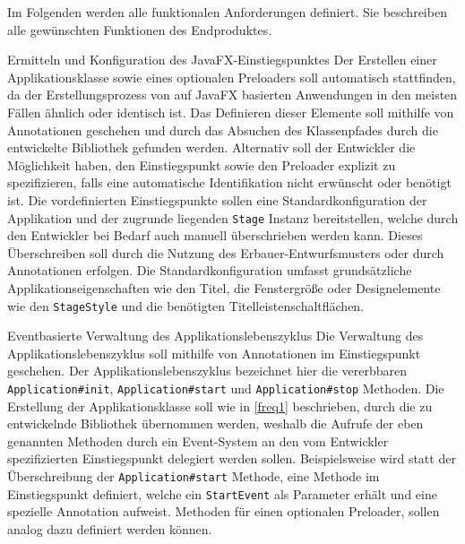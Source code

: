 Im Folgenden werden alle funktionalen Anforderungen definiert. Sie beschreiben alle gewünschten Funktionen des Endproduktes.
\begin{freq}{Ermitteln und Konfiguration des JavaFX-Einstiegspunktes}
	Der Erstellen einer Applikationsklasse sowie eines optionalen Preloaders soll automatisch stattfinden, da der Erstellungsprozess von auf JavaFX basierten Anwendungen in den meisten Fällen ähnlich oder identisch ist. Das Definieren dieser Elemente soll mithilfe von Annotationen geschehen und durch das Absuchen des Klassenpfades durch die entwickelte Bibliothek gefunden werden. Alternativ soll der Entwickler die Möglichkeit haben, den Einstiegspunkt sowie den Preloader explizit zu spezifizieren, falls eine automatische Identifikation nicht erwünscht oder benötigt ist. Die vordefinierten Einstiegspunkte sollen eine Standardkonfiguration der Applikation und der zugrunde liegenden \texttt{Stage} Instanz bereitstellen, welche durch den Entwickler bei Bedarf auch manuell überschrieben werden kann. Dieses Überschreiben soll durch die Nutzung des Erbauer-Entwurfsmusters oder durch Annotationen erfolgen. Die Standardkonfiguration umfasst grundsätzliche Applikationseigenschaften wie den Titel, die Fenstergröße oder Designelemente wie den \texttt{StageStyle} und die benötigten Titelleistenschaltflächen.
\end{freq}
\begin{freq}{Eventbasierte Verwaltung des Applikationslebenszyklus}
	Die Verwaltung des Applikationslebenszyklus soll mithilfe von Annotationen im Einstiegspunkt geschehen. Der Applikationslebenszyklus bezeichnet hier die vererbbaren \texttt{Application\#init}, \texttt{Application\#start} und \texttt{Application\#stop} Methoden. Die Erstellung der Applikationsklasse soll wie in \autoref{freq1} beschrieben, durch die zu entwickelnde Bibliothek übernommen werden, weshalb die Aufrufe der eben genannten Methoden durch ein Event-System an den vom Entwickler spezifizierten Einstiegspunkt delegiert werden sollen. Beispielsweise wird statt der Überschreibung der \texttt{Application\#start} Methode, eine Methode im Einstiegspunkt definiert, welche ein \texttt{StartEvent} als Parameter erhält und eine spezielle Annotation aufweist. Methoden für einen optionalen Preloader, sollen analog dazu definiert werden können.
\end{freq}
